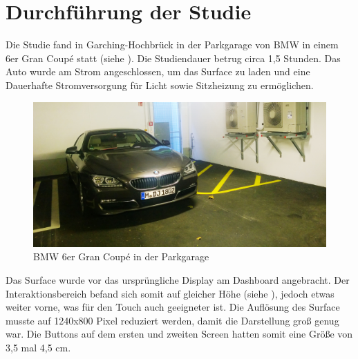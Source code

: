 \section{Durchführung der Studie}
Die Studie fand in Garching-Hochbrück in der Parkgarage von BMW in einem 6er Gran Coupé statt (siehe ). 
Die Studiendauer betrug circa 1,5 Stunden. 
Das Auto wurde am Strom angeschlossen, um das Surface zu laden und eine Dauerhafte Stromversorgung für Licht sowie Sitzheizung zu ermöglichen.
\begin{figure}[ht]
  \centering
  \includegraphics[width=1\textwidth]{img/GranCoupe.jpg}
  \caption{BMW 6er Gran Coupé in der Parkgarage}
  \label{fig:GranCoupe}
\end{figure} 
Das Surface wurde vor das ursprüngliche Display am Dashboard angebracht. 
Der Interaktionsbereich befand sich somit auf gleicher Höhe (siehe ), jedoch etwas weiter vorne, was für den Touch auch geeigneter ist. Die Auflösung des Surface musste auf 1240x800 Pixel reduziert werden, damit die Darstellung groß genug war. Die Buttons auf dem ersten und zweiten Screen hatten somit eine Größe von 3,5 mal 4,5 cm. 

